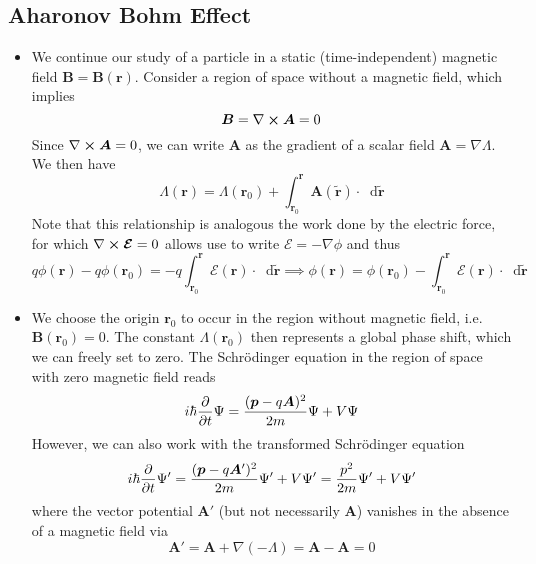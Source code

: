 \documentclass[11pt, a4paper]{article}
\newcommand{\diff}{\mathop{}\!\mathrm{d}} %
\renewcommand{\curl}{\nabla \cross}
\renewcommand{\grad}{\nabla}
\newcommand{\Schro}{Schr\"{o}dinger\xspace}
\renewcommand{\vec}[1]{\bm{#1}}  %
\renewcommand{\t}[1]{\tilde{#1}}
\renewcommand{\r}{\vec{r}}  %
\newcommand{\A}{\vec{A}}  %
\newcommand{\B}{\vec{B}}  %
\renewcommand{\P}{\Psi}  %
\begin{document}
\subsection{Aharonov Bohm Effect}
\begin{itemize}
	\item We continue our study of a particle in a static (time-independent) magnetic field $ \B = \B(\r) $. Consider a region of space without a magnetic field, which implies
	\begin{equation*}
		\B = \curl \A = 0
	\end{equation*} 
	Since $ \curl \A = 0 $, we can write $ \A $ as the gradient of a scalar field $ \A = \grad \Lambda $. We then have
	\begin{equation*}
		\Lambda(\r) = \Lambda(\r_{0}) + \int_{\r_{0}}^{\r}\A(\t{\r})\cdot \diff \t{\r}
	\end{equation*}
	Note that this relationship is analogous the work done by the electric force, for which $ \curl \vec{\mathcal{E}} = 0 $ allows use to write $ \vec{\mathcal{E}} = - \grad \phi $ and thus
	\begin{equation*}
		q\phi(\r) - q\phi(\r_{0}) = - q\int_{\r_{0}}^{\r} \vec{\mathcal{E}}(\r) \cdot \diff \t{\r} \implies \phi(\r) = \phi(\r_{0})  - \int_{\r_{0}}^{\r} \vec{\mathcal{E}}(\r) \cdot \diff \t{\r} 
	\end{equation*}
	
	\item We choose the origin $ \r_{0} $ to occur in the region without magnetic field, i.e. $ \B(\r_{0}) = 0 $. The constant $ \Lambda(\r_{0}) $ then represents a global phase shift, which we can freely set to zero. The \Schro equation in the region of space with zero magnetic field reads
	\begin{equation*}
		i\hbar \pdv{t}\P = \frac{(\vec{p} - q \A)^{2}}{2m} \P + V\P
	\end{equation*}
	However, we can also work with the transformed \Schro equation
	\begin{equation*}
		i\hbar \pdv{t}\P' = \frac{(\vec{p} - q \A')^{2}}{2m} \P' + V\P' = \frac{p^{2}}{2m}\P' + V\P'
	\end{equation*}
	where the vector potential $ \A' $ (but not necessarily $ \A $) vanishes in the absence of a magnetic field via
	\begin{equation*}
		\A' = \A + \grad(-\Lambda) = \A - \A = 0
	\end{equation*}
	
	

\end{itemize}
\end{document}
